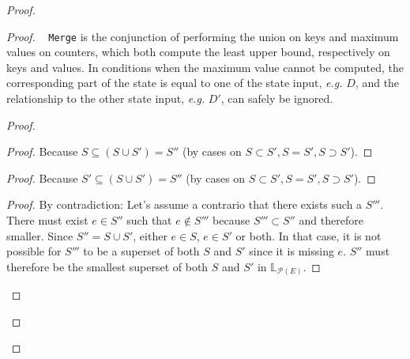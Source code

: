 \documentclass[9pt, oneside]{article}   	%
\begin{document}
\begin{proof}
	\begin{proof}
		\pfsketch~ \texttt{Merge} is the conjunction of performing the union on keys and maximum values on counters, which both compute the least upper bound, respectively on keys and values. In conditions when the maximum value cannot be computed, the corresponding part of the state is equal to one of the state input, \textit{e.g.} $D$, and the relationship to the other state input, \textit{e.g.} $D'$, can safely be ignored.
		\begin{proof}
			\begin{proof}
				Because $S \subseteq (S \cup S') = S''$ (by cases on $S \subset S', S=S', S \supset S'$).
			\end{proof}
			
			\begin{proof}
				Because $S' \subseteq (S \cup S') = S''$ (by cases on $S \subset S', S=S', S \supset S'$).
			\end{proof}
			
			\begin{proof}
				By contradiction: Let's assume a contrario that there exists such a $S'''$. There must exist $e \in S''$ such that $e \notin S'''$ because $S''' \subset S''$ and therefore smaller. Since $S'' = S \cup S'$, either $e \in S$, $e \in S'$ or both. In that case, it is not possible for $S'''$ to be a superset of both $S$ and $S'$ since it is missing $e$. $S''$ must therefore be the smallest superset of both $S$ and $S'$ in $\mathds{L}_{\mathcal{P}(E)}$.
			\end{proof}


\end{proof}
\end{proof}
\end{proof}
\end{document}
